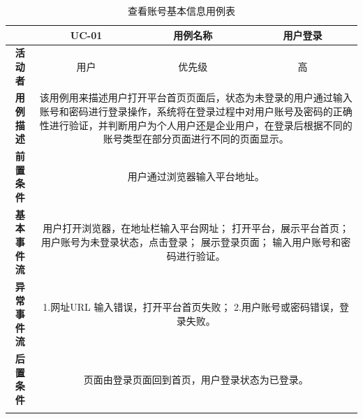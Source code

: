 \begin{longtable}[c]{c|ccc}
	\caption{查看账号基本信息用例表}
	\label{tab:tab6}\\
	\shline
	\multicolumn{1}{c|}{\textbf{用例编号}} & \multicolumn{1}{c|}{UC-01} & \multicolumn{1}{c|}{用例名称} &  用户登录\\ \hline
	\endhead
	\multicolumn{1}{c|}{\textbf{活动者}} & \multicolumn{1}{c|}{用户} & \multicolumn{1}{c|}{优先级} &高  \\ \hline
	\textbf{用例描述} & \multicolumn{3}{p{12cm}}{该用例用来描述用户打开平台首页页面后，状态为未登录的用户通过输入账号和密码进行登录操作，系统将在登录过程中对用户账号及密码的正确性进行验证，并判断用户为个人用户还是企业用户，在登录后根据不同的账号类型在部分页面进行不同的页面显示。} \\ \hline
	\textbf{前置条件}& \multicolumn{3}{p{12cm}}{用户通过浏览器输入平台地址。} \\ \hline
	\textbf{基本事件流}& \multicolumn{3}{p{12cm}}{用户打开浏览器，在地址栏输入平台网址；\newline
		打开平台，展示平台首页；\newline
		用户账号为未登录状态，点击登录；\newline
		展示登录页面；\newline
		输入用户账号和密码进行验证。} \\ \hline
	\textbf{异常事件流}& \multicolumn{3}{p{12cm}}{1.网址URL 输入错误，打开平台首页失败；\newline
		2.用户账号或密码错误，登录失败。
	} \\ \hline
	\textbf{后置条件}& \multicolumn{3}{p{12cm}}{页面由登录页面回到首页，用户登录状态为已登录。} \\ \shline
\end{longtable}

